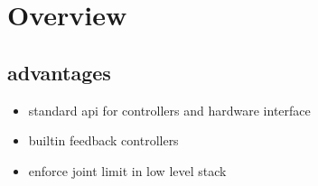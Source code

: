 \documentclass[a4paper]{article}
\begin{document}
      \section{Overview}
      \subsection{advantages}
      \begin{itemize}
          \item standard api for controllers and hardware interface
          \item builtin feedback controllers
          \item enforce joint limit in low level stack 
      \end{itemize}
\end{document}
